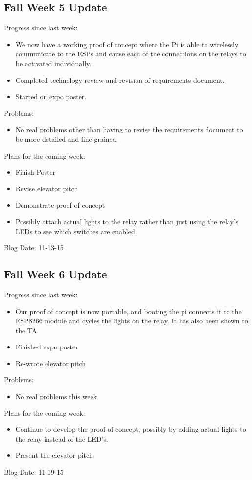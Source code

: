 \subsection{Fall Week 5 Update}
Progress since last week:
\begin{itemize}
   \item We now have a working proof of concept where the Pi is able to wirelessly communicate to the ESPs and cause each of the connections on the relays to be activated individually.
   \item Completed technology review and revision of requirements document.
   \item Started on expo poster.
\end{itemize}
Problems:
\begin{itemize}
   \item No real problems other than having to revise the requirements document to be more detailed and fine-grained.
\end{itemize}
Plans for the coming week:
\begin{itemize}
   \item Finish Poster
   \item Revise elevator pitch
   \item Demonstrate proof of concept
   \item Possibly attach actual lights to the relay rather than just using the relay's LEDs to see which switches are enabled.
\end{itemize}
Blog Date: 11-13-15

\subsection{Fall Week 6 Update}
Progress since last week:
\begin{itemize}
   \item Our proof of concept is now portable, and booting the pi connects it to the ESP8266 module and cycles the lights on the relay.​ It has also been shown to the TA.
   \item Finished expo poster
   \item Re-wrote elevator pitch
\end{itemize}
Problems:
\begin{itemize}
   \item No real problems this week
\end{itemize}
Plans for the coming week:
\begin{itemize}
   \item Continue to develop the proof of concept, possibly by adding actual lights to the relay instead of the LED's.
   \item Present the elevator pitch​
\end{itemize}
Blog Date: 11-19-15

